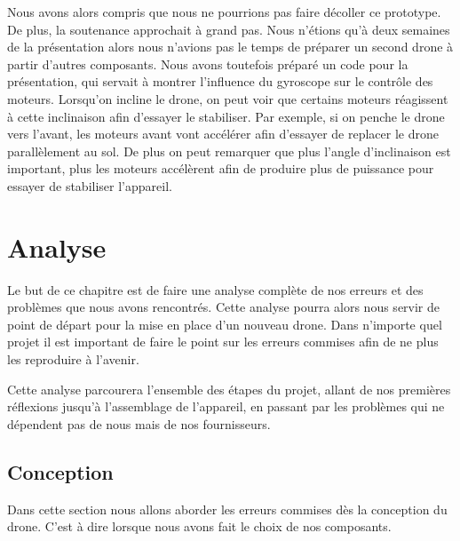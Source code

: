 \documentclass[a4paper,10pt]{report}
\begin{document}
	  Nous avons alors compris que nous ne pourrions pas faire décoller ce 
prototype. De plus, la soutenance approchait à grand pas. Nous n'étions qu'à 
deux semaines de la présentation alors nous n'avions pas le temps de préparer un 
second drone à partir d'autres composants. Nous avons toutefois préparé un code 
pour la présentation, qui servait à montrer l'influence du gyroscope sur le 
contrôle des moteurs. Lorsqu'on incline le drone, on peut voir que certains 
moteurs réagissent à cette inclinaison afin d'essayer le stabiliser. Par 
exemple, si on penche le drone vers l'avant, les moteurs avant vont accélérer 
afin d'essayer de replacer le drone parallèlement au sol. De plus on peut 
remarquer que plus l'angle d'inclinaison est important, plus les moteurs 
accélèrent afin de produire plus de puissance pour essayer de stabiliser 
l'appareil.

  \chapter{Analyse}
    Le but de ce chapitre est de faire une analyse complète de nos erreurs et 
des problèmes que nous avons rencontrés. Cette analyse pourra alors nous servir 
de point de départ pour la mise en place d'un nouveau drone. Dans n'importe 
quel projet il est important de faire le point sur les erreurs commises afin de 
ne plus les reproduire à l'avenir.

    Cette analyse parcourera l'ensemble des étapes du projet, allant de nos 
premières réflexions jusqu'à l'assemblage de l'appareil, en passant par les 
problèmes qui ne dépendent pas de nous mais de nos fournisseurs.

    \section{Conception}
      Dans cette section nous allons aborder les erreurs commises dès la 
conception du drone. C'est à dire lorsque nous avons fait le choix de nos 
composants.
\end{document}
